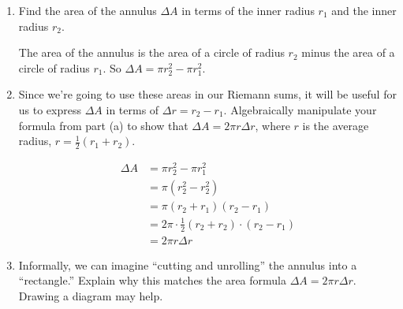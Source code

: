 \documentclass{article}
\begin{document}
\begin{enumerate}
\begin{center}
\hfill\strut
\end{center}

\begin{enumerate}
    \item 
    \begin{problem}
        Find the area of the annulus $\Delta A$ in terms of the inner radius $r_1$ and the inner radius $r_2$.
    \end{problem}
    \pspace{\vfill}

    \begin{solution}
    The area of the annulus is the area of a circle of radius $r_2$ minus the area of a circle of radius $r_1$. So $\Delta A = \pi r_2^2 - \pi r_1^2$.
    \end{solution}

    \item
    \begin{problem}
        Since we're going to use these areas in our Riemann sums, it will be useful for us to express $\Delta A$ in terms of $\Delta r = r_2 - r_1$. Algebraically manipulate your formula from part (a) to show that $\Delta A = 2\pi r \Delta r$, where $r$ is the average radius, $r=\frac{1}{2}(r_1+r_2)$.
    \end{problem}

    \begin{solution}
        \begin{align*}
            \Delta A &= \pi r_2^2 - \pi r_1^2 \\
            &= \pi (r_2^2 - r_2^2) \\
            &= \pi (r_2+r_1)(r_2-r_1) \\
            &= 2\pi \cdot \tfrac{1}{2}(r_2+r_2)\cdot (r_2-r_1) \\
            &= 2\pi r\Delta r
        \end{align*}
    \end{solution}

        \item
    \begin{problem}
        Informally, we can imagine ``cutting and unrolling'' the annulus into a ``rectangle.'' Explain why this matches the area formula $\Delta A = 2\pi r\Delta r$. Drawing a diagram may help.
    \end{problem}


\end{enumerate}
\end{enumerate}
\end{document}
